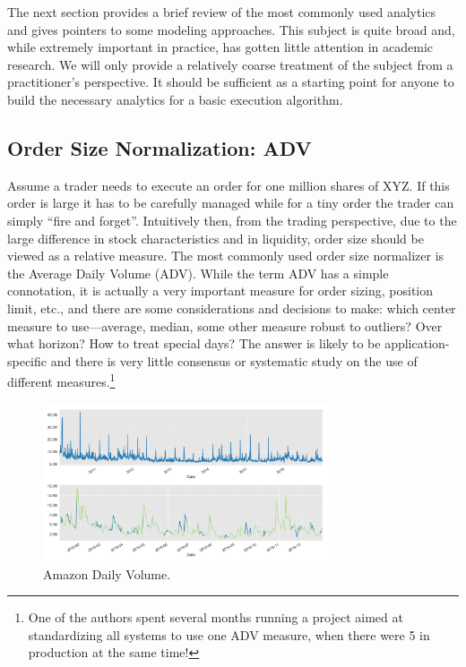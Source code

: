 The next section provides a brief review of the most commonly used analytics and gives pointers to some modeling approaches. This subject is quite broad and, while extremely important in practice, has gotten little attention in academic research. We will only provide a relatively coarse treatment of the subject from a practitioner's perspective. It should be sufficient as a starting point for anyone to build  the necessary analytics for a basic execution algorithm. 



\subsection{Order Size Normalization: ADV}

Assume a trader needs to execute an order for one million shares of XYZ. If this order is large it has to be carefully managed while for a tiny order the trader can simply ``fire and forget''.  Intuitively then, from the trading perspective, due to  the large difference in stock characteristics and in liquidity, order size should be viewed as a relative measure. The most commonly used order size normalizer is the Average Daily Volume (ADV). While the term ADV has a simple connotation, it is actually a very important measure for order sizing, position limit, etc., and there are some considerations and decisions to make: which center measure to use---average, median, some other measure robust to outliers? Over what horizon? How to treat special days? The answer is likely to be application-specific and there is very little consensus or systematic study on the use of different measures.\footnote{One of the authors spent several months running a project aimed at standardizing all systems to use one ADV measure, when there were 5 in production at the same time!}
 	
	\begin{figure}[!ht]
		\centering
			\includegraphics[width=0.75\textwidth]{chapters/chapter_trade_data_models/figures/daily_volume.png} 
		\caption{Amazon Daily Volume. \label{fig:daily_volume}}
	\end{figure}


